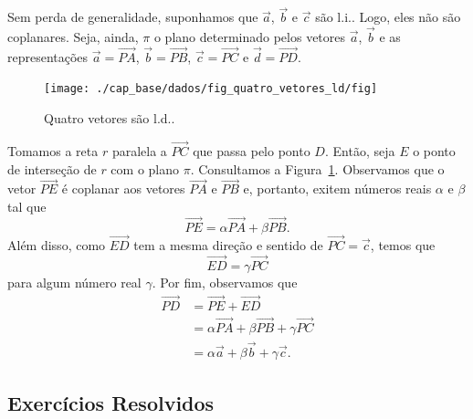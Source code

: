 Sem perda de generalidade, suponhamos que $\vec{a}$, $\vec{b}$ e $\vec{c}$ são l.i.. Logo, eles não são coplanares. Seja, ainda, $\pi$ o plano determinado pelos vetores $\vec{a}$, $\vec{b}$ e as representações $\vec{a}=\overrightarrow{PA}$, $\vec{b}=\overrightarrow{PB}$, $\vec{c}=\overrightarrow{PC}$ e $\vec{d}=\overrightarrow{PD}$.

\begin{figure}[h]
  \centering
  \texttt{[image: ./cap\_base/dados/fig\_quatro\_vetores\_ld/fig]}
  \caption{Quatro vetores são l.d..}
  \label{cap_base_sec_deplinear:fig:quatro_vetores_ld}
\end{figure}

Tomamos a reta $r$ paralela a $\overrightarrow{PC}$ que passa pelo ponto $D$. Então, seja $E$ o ponto de interseção de $r$ com o plano $\pi$. Consultamos a Figura~\ref{cap_base_sec_deplinear:fig:quatro_vetores_ld}. Observamos que o vetor $\overrightarrow{PE}$ é coplanar aos vetores $\overrightarrow{PA}$ e $\overrightarrow{PB}$ e, portanto, exitem números reais $\alpha$ e $\beta$ tal que
\begin{equation}
  \overrightarrow{PE} = \alpha\overrightarrow{PA} + \beta\overrightarrow{PB}.
\end{equation}
Além disso, como $\overrightarrow{ED}$ tem a mesma direção e sentido de $\overrightarrow{PC} = \vec{c}$, temos que
\begin{equation}
  \overrightarrow{ED} = \gamma\overrightarrow{PC}
\end{equation}
para algum número real $\gamma$. Por fim, observamos que
\begin{align*}
  \overrightarrow{PD} &= \overrightarrow{PE} + \overrightarrow{ED}\\
                      &= \alpha\overrightarrow{PA} + \beta\overrightarrow{PB} + \gamma\overrightarrow{PC}\\
                      &= \alpha\vec{a} + \beta\vec{b} + \gamma\vec{c}.
\end{align*}

\subsection{Exercícios Resolvidos}

